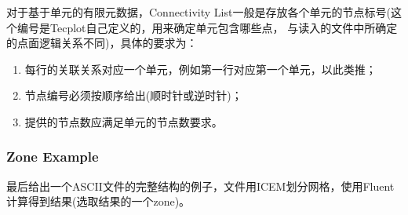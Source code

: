 \documentclass[lang=cn,11pt,a4paper]{elegantpaper}
\begin{document}
对于基于单元的有限元数据，Connectivity List一般是存放各个单元的节点标号(这个编号是Tecplot自己定义的，用来确定单元包含哪些点，
与读入的文件中所确定的点面逻辑关系不同)，具体的要求为：
\begin{enumerate}
  \item 每行的关联关系对应一个单元，例如第一行对应第一个单元，以此类推；
  \item 节点编号必须按顺序给出(顺时针或逆时针)；
  \item 提供的节点数应满足单元的节点数要求。
\end{enumerate}

\subsubsection{Zone Example}\label{zoneExample}
最后给出一个ASCII文件的完整结构的例子，文件用ICEM划分网格，使用Fluent计算得到结果(选取结果的一个zone)。
\end{document}
